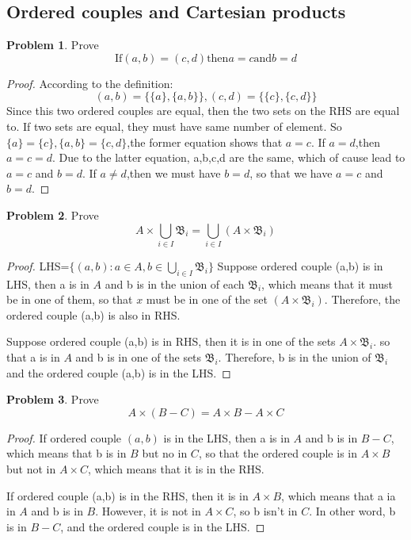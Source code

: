 \documentclass[a4paper,11pt]{article}%
\theoremstyle{remark}
\theoremstyle{definition}
\newtheorem{problem}{Problem}[subsection]
\begin{document}
\subsection{Ordered couples and Cartesian products}
\begin{problem}
    Prove 
    \[\text{If} (a,b)=(c,d)\text{then} a=c \text{and}b=d\]
\begin{proof}
    According to the definition:
    \[(a,b)=\{\{a\},\{a,b\}\},(c,d)=\{\{c\},\{c,d\}\}\]
    Since this two ordered couples are equal, then the two sets on the RHS 
    are equal to. If two sets are equal, they must have same number  of element.
    So $\{a\}=\{c\},\{a,b\}=\{c,d\}$,the former equation shows that $a=c$.
    If $a=d$,then $a=c=d$. Due to the latter equation, a,b,c,d are the same, which of
    cause lead to $a=c$ and $b=d$.
    If $a\neq d$,then we must have $b=d$, so that we have $a=c$ and $b=d$.
\end{proof}
\end{problem}
\begin{problem}
    Prove
    \[A\times \bigcup_{i\in I}\mathfrak{B}_i=\bigcup_{i\in I}(A\times \mathfrak{B}_i)\]
\begin{proof}
        LHS=$\{(a,b):a\in A,b\in \bigcup_{i\in I}\mathfrak{B}_i\}$
   Suppose ordered couple (a,b) is in LHS, then a is in $A$ and b is in the 
   union of each $\mathfrak{B}_i$, which means that it must be in one of them,
   so that $x$ must be in one of the set $(A\times \mathfrak{B}_i)$. Therefore,
   the ordered couple (a,b) is also in RHS. 
   
   Suppose ordered couple (a,b) is in RHS, then it is in one of the sets $A\times \mathfrak{B}_i$.
   so that a is in $A$ and b is in one of the sets $\mathfrak{B}_i$. Therefore, 
   b is in the union of $\mathfrak{B}_i$ and the ordered couple (a,b) is in
   the LHS.
\end{proof}
\end{problem}
\begin{problem}
    Prove 
    \[A\times(B-C)=A\times B-A\times C\]
    \begin{proof}
        If ordered couple $(a,b)$ is in the LHS, then a is in $A$ and 
        b is in $B-C$, which means that b is in $B$ but no in $C$, so
        that the ordered couple is in $A\times B$ but not in $A\times C$,
        which means that it is in the RHS.

        If ordered couple (a,b) is in the RHS, then it is in $A\times B$,
        which means that a ia in $A$ and b is in $B$. However, it is not 
        in $A\times C$, so b isn't in $C$. In other word, b is in $B-C$, and
        the ordered couple is in the LHS.
    \end{proof}
\end{problem}
\end{document}
